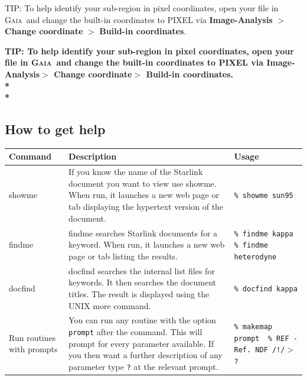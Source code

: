 \documentclass[twoside,11pt]{article}
\newenvironment{latexonly}{}{}
\newcommand{\xref}[3]{#1}
\newcommand{\xlabel}[1]{}
\renewcommand{\_}{\texttt{\symbol{95}}}
\newenvironment{fmpage}[1]{\begin{lrbox}{\fmbox}\begin{minipage}{#1}}{\end{minipage}\end{lrbox}\fbox{\usebox{\fmbox}}}
\newcommand{\gaia}{\xref{\textsc{Gaia}}{sun214}{}}
\newcommand{\task}[1]{\textsf{#1}}
\newcommand{\gaiathing}[1]{\textbf{\textsf{#1}}}
\begin{document}
\begin{latexonly}
\begin{center}
\begin{fmpage}{0.95\linewidth}
\vspace{0.1cm}
TIP: To help identify your sub-region in pixel coordinates, open your file in \gaia\ and change the built-in coordinates to PIXEL via \gaiathing{Image-Analysis} $>$ \gaiathing{Change coordinate} $>$ \gaiathing{Build-in coordinates}. 
\end{fmpage}
\end{center}
\end{latexonly}

\begin{htmlonly}
\textbf{TIP: To help identify your sub-region in pixel coordinates, open your file in \gaia\ and change the built-in coordinates to PIXEL via \gaiathing{Image-Analysis}$>$ \gaiathing{Change coordinate}$>$ \gaiathing{Build-in coordinates}. \\*\\*}
\end{htmlonly}

\newpage
\subsection{\xlabel{help}How to get help}
\label{sec:help}
\begin{table}[h!]
\begin{tabular}{p{2.3cm}|p{7.3cm}|p{5cm}}
\textbf{Command} & \textbf{Description} & \textbf{Usage}\\
\hline
\task{showme} & If you know the name of the Starlink document you want to view
                use \task{showme}. When run, it launches a new web page or tab
                displaying the hypertext version of the document. &
                \texttt{\% showme sun95}\\
\hline
\task{findme} & \task{findme} searches Starlink documents for a keyword. When
                run, it launches a new web page or tab listing the results. &
                \texttt{\% findme kappa} \newline  \texttt{\% findme heterodyne}\\
\hline
\task{docfind} & \task{docfind} searches the internal list files for keywords. It then
                 searches the document titles. The result is displayed using the
                 UNIX \task{more} command. & \texttt{\% docfind kappa}\\
\hline
Run routines with prompts & You can run any routine with the option
                            \texttt{prompt} after the command. This will
                            prompt for every parameter available. If you
                            then want a further description of any parameter
                            type  \texttt{?} at the relevant prompt. &
                            \texttt{\% makemap prompt \newline\ \% REF - Ref. NDF /!/$>$ ?}\\
\hline
\end{tabular}
\end{table}
\end{document}
